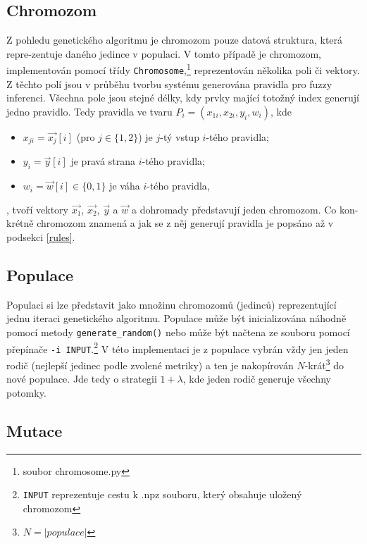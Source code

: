 \documentclass{article}
\begin{document}
\subsection{Chromozom}

Z pohledu genetického algoritmu je chromozom pouze datová struktura, která repre-zentuje daného jedince v populaci. V tomto případě je chromozom, implementován pomocí třídy \texttt{Chromosome},\footnote{soubor chromosome.py} reprezentován několika poli či vektory. Z těchto polí jsou v průběhu tvorbu systému generována pravidla pro fuzzy inferenci. Všechna pole jsou stejné délky, kdy prvky mající totožný index generují jedno pravidlo. Tedy pravidla ve tvaru $P_i = (x_{1i}, x_{2i}, y_i, w_i)$, kde

\begin{itemize}
    \item $x_{ji} = \overrightarrow{x_j}\left[i\right]$ (pro $j \in \{1, 2\}$) je $j$-tý vstup $i$-tého pravidla;
    \item $y_i = \overrightarrow{y}\left[i\right]$ je pravá strana $i$-tého pravidla;
    \item $w_i = \overrightarrow{w}\left[i\right] \in \{0, 1\}$ je váha $i$-tého pravidla,
\end{itemize}
, tvoří vektory $\overrightarrow{x_1}$, $\overrightarrow{x_2}$, $\overrightarrow{y}$ a $\overrightarrow{w}$ a dohromady představují jeden chromozom. Co kon-krétně chromozom znamená a jak se z něj generují pravidla je popsáno až v podsekci \ref{rules}.

\subsection{Populace}

Populaci si lze představit jako množinu chromozomů (jedinců) reprezentující jednu iteraci genetického algoritmu. Populace může být inicializována náhodně pomocí metody \texttt{generate\_random()} nebo může být načtena ze souboru pomocí přepínače \texttt{-i INPUT}.\footnote{\texttt{INPUT} reprezentuje cestu k .npz souboru, který obsahuje uložený chromozom} V této implementaci je z populace vybrán vždy jen jeden rodič (nejlepší jedinec podle zvolené metriky) a ten je nakopírován $N$-krát\footnote{$N = |populace|$} do nové populace. Jde tedy o strategii $1 + \lambda$, kde jeden rodič generuje všechny potomky.

\subsection{Mutace}
\end{document}

